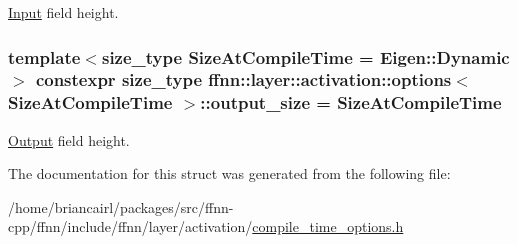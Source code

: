 \hyperlink{classffnn_1_1layer_1_1_input}{Input} field height. 

\hypertarget{structffnn_1_1layer_1_1activation_1_1options_a21ed6511496f57fe62bd15f71c2c14ef}{
\subsubsection[{output\-\_\-size}]{\setlength{\rightskip}{0pt plus 5cm}template$<$size\-\_\-type Size\-At\-Compile\-Time = Eigen\-::\-Dynamic$>$ constexpr {\bf size\-\_\-type} {\bf ffnn\-::layer\-::activation\-::options}$<$ Size\-At\-Compile\-Time $>$\-::output\-\_\-size = Size\-At\-Compile\-Time\hspace{0.3cm}{\ttfamily [static]}}}\label{structffnn_1_1layer_1_1activation_1_1options_a21ed6511496f57fe62bd15f71c2c14ef}


\hyperlink{classffnn_1_1layer_1_1_output}{Output} field height. 



The documentation for this struct was generated from the following file\-:\begin{DoxyCompactItemize}
\item 
/home/briancairl/packages/src/ffnn-\/cpp/ffnn/include/ffnn/layer/activation/\hyperlink{activation_2compile__time__options_8h}{compile\-\_\-time\-\_\-options.\-h}\end{DoxyCompactItemize}
